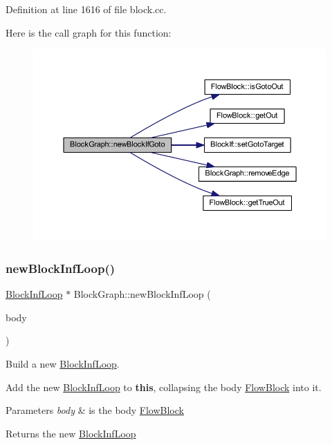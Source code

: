 Definition at line 1616 of file block.\+cc.

Here is the call graph for this function\+:
\nopagebreak
\begin{figure}[H]
\begin{center}
\leavevmode
\includegraphics[width=350pt]{class_block_graph_ad25eb345760dc1732c0117f7bb0a72ce_cgraph}
\end{center}
\end{figure}
\mbox{\label{class_block_graph_a4729c7a662b511b4112361e063336c36}} 
\subsubsection{\texorpdfstring{newBlockInfLoop()}{newBlockInfLoop()}}
{\footnotesize\ttfamily \mbox{\hyperlink{class_block_inf_loop}{Block\+Inf\+Loop}} $\ast$ Block\+Graph\+::new\+Block\+Inf\+Loop (\begin{DoxyParamCaption}\item[{\mbox{\hyperlink{class_flow_block}{Flow\+Block}} $\ast$}]{body }\end{DoxyParamCaption})}



Build a new \mbox{\hyperlink{class_block_inf_loop}{Block\+Inf\+Loop}}. 

Add the new \mbox{\hyperlink{class_block_inf_loop}{Block\+Inf\+Loop}} to {\bfseries{this}}, collapsing the body \mbox{\hyperlink{class_flow_block}{Flow\+Block}} into it. 
\begin{DoxyParams}{Parameters}
{\em body} & is the body \mbox{\hyperlink{class_flow_block}{Flow\+Block}} \\
\hline
\end{DoxyParams}
\begin{DoxyReturn}{Returns}
the new \mbox{\hyperlink{class_block_inf_loop}{Block\+Inf\+Loop}} 
\end{DoxyReturn}



